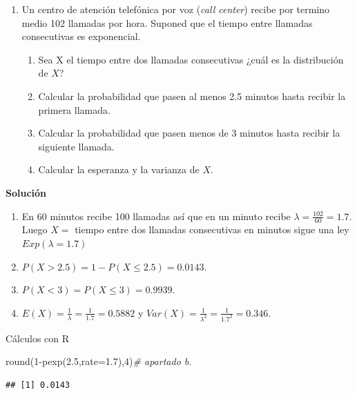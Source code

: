 \documentclass[
]{article}
\newenvironment{Shaded}{\begin{snugshade}}{\end{snugshade}}
\newcommand{\AttributeTok}[1]{\textcolor[rgb]{0.77,0.63,0.00}{#1}}
\newcommand{\CommentTok}[1]{\textcolor[rgb]{0.56,0.35,0.01}{\textit{#1}}}
\newcommand{\DecValTok}[1]{\textcolor[rgb]{0.00,0.00,0.81}{#1}}
\newcommand{\FloatTok}[1]{\textcolor[rgb]{0.00,0.00,0.81}{#1}}
\newcommand{\FunctionTok}[1]{\textcolor[rgb]{0.00,0.00,0.00}{#1}}
\newcommand{\NormalTok}[1]{#1}
\newcommand{\SpecialCharTok}[1]{\textcolor[rgb]{0.00,0.00,0.00}{#1}}
\providecommand{\tightlist}{%
  \setlength{\itemsep}{0pt}\setlength{\parskip}{0pt}}
\begin{document}
\begin{enumerate}
\def\labelenumi{\arabic{enumi}.}
\setcounter{enumi}{2}
\tightlist
\item
  Un centro de atención telefónica por voz (\emph{call center}) recibe
  por termino medio 102 llamadas por hora. Suponed que el tiempo entre
  llamadas consecutivas es exponencial.

  \begin{enumerate}
  \def\labelenumii{\alph{enumii}.}
  \tightlist
  \item
    Sea X el tiempo entre dos llamadas consecutivas ¿cuál es la
    distribución de \(X\)?
  \item
    Calcular la probabilidad que pasen al menos 2.5 minutos hasta
    recibir la primera llamada.
  \item
    Calcular la probabilidad que pasen menos de 3 minutos hasta recibir
    la siguiente llamada.
  \item
    Calcular la esperanza y la varianza de \(X\).
  \end{enumerate}
\end{enumerate}

\textbf{Solución}

\begin{enumerate}
\def\labelenumi{\alph{enumi}.}
\item
  En 60 minutos recibe 100 llamadas así que en un minuto recibe
  \(\lambda=\frac{102}{60}=1.7\). Luego \(X=\) tiempo entre dos llamadas
  consecutivas en minutos sigue una ley \(Exp(\lambda=1.7)\)
\item
  \(P(X>2.5)=1-P(X\leq 2.5)=0.0143.\)
\item
  \(P(X<3)=P(X\leq 3)=0.9939.\)
\item
  \(E(X)=\frac{1}{\lambda}=\frac{1}{1.7}=0.5882\) y
  \(Var(X)=\frac{1}{\lambda^2}=\frac{1}{1.7^2}=0.346.\)
\end{enumerate}

Cálculos con R

\begin{Shaded}
\begin{Highlighting}[]
\FunctionTok{round}\NormalTok{(}\DecValTok{1}\SpecialCharTok{{-}}\FunctionTok{pexp}\NormalTok{(}\FloatTok{2.5}\NormalTok{,}\AttributeTok{rate=}\FloatTok{1.7}\NormalTok{),}\DecValTok{4}\NormalTok{)}\CommentTok{\# apartado b.}
\end{Highlighting}
\end{Shaded}

\begin{verbatim}
## [1] 0.0143
\end{verbatim}
\end{document}
